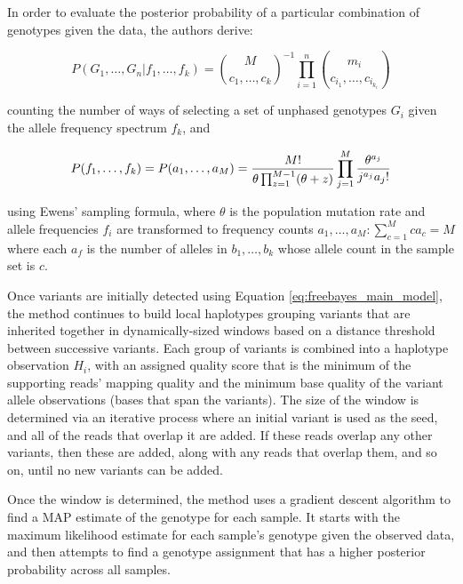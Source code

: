 In order to evaluate the posterior probability of a particular combination of genotypes given the data, the authors derive:

\begin{equation}
\label{eq:freebayes_unphasedsampling}
P(G_1,\ldots,G_n | f_1,\ldots,f_k) =
{ M \choose c_1,\ldots,c_k }^{-1}
\prod_{i=1}^n { m_i \choose c_{i_1}, \ldots, c_{i_{k_i}}}
\end{equation}
    
counting the number of ways of selecting a set of unphased genotypes $G_i$ given the allele frequency spectrum $f_k$, and

\begin{equation}
    \label{eq:freebayes_afs}
P(f_1,\ldots,f_k) =
P(a_1,\ldots,a_M) = 
{M! \over \theta \prod_{z=1}^{M-1}(\theta+z)}
\prod_{j=1}^M{\theta^{a_j} \over j^{a_j} a_j!}
\end{equation}

using Ewens' sampling formula\autocite{ewens1972sampling}, where $\theta$ is the population mutation rate and allele frequencies $f_i$ are transformed to frequency counts $a_1,\ldots,a_M : \sum_{c=1}^M{ca_c} = M$ where each $a_f$ is the number of alleles in $b_1,\ldots,b_k$ whose allele count in the sample set is $c$.

Once variants are initially detected using Equation \ref{eq:freebayes_main_model}, the method continues to build local haplotypes grouping variants that are inherited together in dynamically-sized windows based on a distance threshold between successive variants. Each group of variants is combined into a haplotype observation $H_i$, with an assigned quality score that is the minimum of the supporting reads' mapping quality and the minimum base quality of the variant allele observations (bases that span the variants). The size of the window is determined via an iterative process where an initial variant is used as the seed, and all of the reads that overlap it are added. If these reads overlap any other variants, then these are added, along with any reads that overlap them, and so on, until no new variants can be added.

Once the window is determined, the method uses a gradient descent algorithm to find a MAP estimate of the genotype for each sample. It starts with the maximum likelihood estimate for each sample's genotype given the observed data, and then attempts to find a genotype assignment that has a higher posterior probability across all samples.


